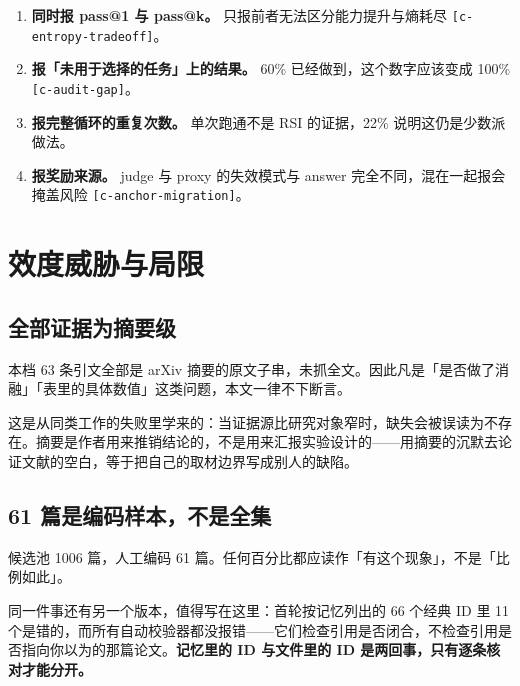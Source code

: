 \begin{enumerate}
  \item \textbf{同时报 pass@1 与 pass@k。} 只报前者无法区分能力提升与熵耗尽 {\scriptsize\texttt{[c-\hspace{0pt}entropy-\hspace{0pt}tradeoff]}}。
  \item \textbf{报「未用于选择的任务」上的结果。} 60\% 已经做到，这个数字应该变成 100\% {\scriptsize\texttt{[c-\hspace{0pt}audit-\hspace{0pt}gap]}}。
  \item \textbf{报完整循环的重复次数。} 单次跑通不是 RSI 的证据，22\% 说明这仍是少数派做法。
  \item \textbf{报奖励来源。} judge 与 proxy 的失效模式与 answer 完全不同，混在一起报会掩盖风险 {\scriptsize\texttt{[c-\hspace{0pt}anchor-\hspace{0pt}migration]}}。
\end{enumerate}

\section{效度威胁与局限}

\subsection{全部证据为摘要级}

本档 63 条引文全部是 arXiv 摘要的原文子串，未抓全文。因此凡是「是否做了消融」「表里的具体数值」这类问题，本文一律不下断言。


这是从同类工作的失败里学来的：当证据源比研究对象窄时，缺失会被误读为不存在。摘要是作者用来推销结论的，不是用来汇报实验设计的——用摘要的沉默去论证文献的空白，等于把自己的取材边界写成别人的缺陷。


\subsection{61 篇是编码样本，不是全集}

候选池 1006 篇，人工编码 61 篇。任何百分比都应读作「有这个现象」，不是「比例如此」。


同一件事还有另一个版本，值得写在这里：首轮按记忆列出的 66 个经典 ID 里 11 个是错的，而所有自动校验器都没报错——它们检查引用是否闭合，不检查引用是否指向你以为的那篇论文。\textbf{记忆里的 ID 与文件里的 ID 是两回事，只有逐条核对才能分开。}


